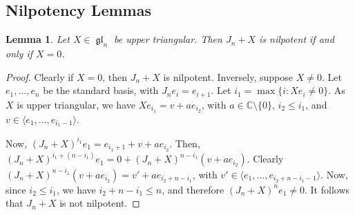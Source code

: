 \documentclass[12pt,psamsfonts]{article}
\DeclareMathOperator{\gl}{\mathfrak{gl}}
\newtheorem{lemma}[theorem]{Lemma}
\begin{document}
\subsection{Nilpotency Lemmas}
\begin{lemma}
    Let \(X \in \gl_n\) be upper triangular.
    Then \(J_n + X\) is nilpotent if and only if \(X = 0\).
\end{lemma}
\begin{proof}
    Clearly if \(X = 0\), then \(J_n + X\) is nilpotent.
    Inversely, suppose \(X \neq 0\).
    Let \(e_1, ..., e_n\) be the standard basis, with \(J_n e_i = e_{i + 1}\).
    Let \(i_1 = \max\{i : Xe_i \neq 0\}\).
    As \(X\) is upper triangular, we have \(X e_{i_1} = v + ae_{i_2}\), with \(a \in \mathbb{C}\setminus\{0\}\), \(i_2 \leq i_1\), and \(v \in \langle e_1, ..., e_{i_1 - 1}\rangle\).
    \par Now, \((J_n + X)^{i_1} e_1 = e_{i_1 + 1} + v + ae_{i_2}\).
    Then, \((J_n + X)^{i_1 + (n - i_1)} e_1 = 0 + (J_n + X)^{n - i_1} (v + ae_{i_2})\).
    Clearly \((J_n + X)^{n - i_1} (v + ae_{i_2}) = v' + ae_{i_2 + n - i_1}\), with \(v' \in \langle e_1, ..., e_{i_2 + n - i_1 - 1} \rangle\).
    Now, since \(i_2 \leq i_1\), we have \(i_2 + n - i_1 \leq n\), and therefore \((J_n + X)^n e_1 \neq 0\).
    It follows that \(J_n + X\) is not nilpotent.
\end{proof}
\end{document}
